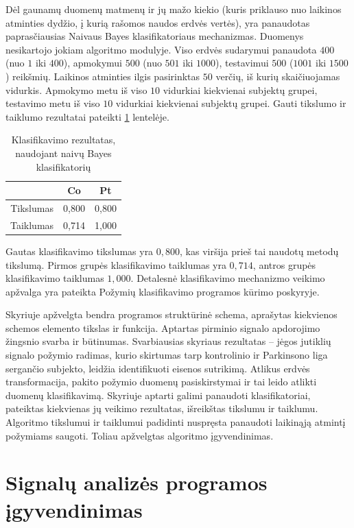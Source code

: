 \documentclass[]{vgtuef}
\begin{document}
Dėl gaunamų duomenų matmenų ir jų mažo kiekio (kuris priklauso nuo laikinos atminties dydžio, į kurią rašomos naudos erdvės vertės), yra panaudotas paprasčiausias Naivaus Bayes klasifikatoriaus mechanizmas. Duomenys nesikartojo jokiam algoritmo modulyje. Viso erdvės sudarymui panaudota $400$ (nuo $1$ iki $400$), apmokymui $500$ (nuo $501$ iki $1000$), testavimui $500$ ($1001$ iki $1500$) reikšmių. Laikinos atminties ilgis pasirinktas $50$ verčių, iš kurių skaičiuojamas vidurkis. Apmokymo metu iš viso $10$ vidurkiai kiekvienai subjektų grupei, testavimo metu iš viso $10$ vidurkiai kiekvienai subjektų grupei. Gauti tikslumo ir taiklumo rezultatai pateikti \ref{table:classification_results} lentelėje.

\begin{table}
	\centering
	\renewcommand{\arraystretch}{1.3}
	\caption{Klasifikavimo rezultatas, naudojant naivų Bayes klasifikatorių}
	\label{table:classification_results}
	\begin{tabular}{|c|c|c|} \hline
		& Co & Pt \\ \hline
    Tikslumas & 0,800 & 0,800 \\ \hline
    Taiklumas & 0,714 & 1,000 \\ \hline
	\end{tabular}
\end{table}

Gautas klasifikavimo tikslumas yra $0,800$, kas viršija prieš tai naudotų metodų tikslumą. Pirmos grupės klasifikavimo taiklumas yra $0,714$, antros grupės klasifikavimo taiklumas $1,000$. Detalesnė klasifikavimo mechanizmo veikimo apžvalga yra pateikta Požymių klasifikavimo programos kūrimo poskyryje.

Skyriuje apžvelgta bendra programos struktūrinė schema, aprašytas kiekvienos schemos elemento tikslas ir funkcija. Aptartas pirminio signalo apdorojimo žingsnio svarba ir būtinumas. Svarbiausias skyriaus rezultatas -- jėgos jutiklių signalo požymio radimas, kurio skirtumas tarp kontrolinio ir Parkinsono liga sergančio subjekto, leidžia identifikuoti eisenos sutrikimą. Atlikus erdvės transformacija, pakito požymio duomenų pasiskirstymai ir tai leido atlikti duomenų klasifikavimą. Skyriuje aptarti galimi panaudoti klasifikatoriai, pateiktas kiekvienas jų veikimo rezultatas, išreikštas tikslumu ir taiklumu. Algoritmo tikslumui ir taiklumui padidinti nuspręsta panaudoti laikinąją atmintį požymiams saugoti. Toliau apžvelgtas algoritmo įgyvendinimas.

\section{Signalų analizės programos įgyvendinimas}
\end{document}
